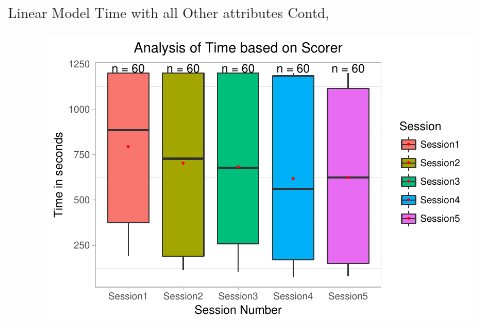 \documentclass{beamer}
\begin{document}
\begin{frame}{Linear Model}{ Time with all Other attributes Contd,}
\begin{figure}
\begin{minipage}[c]{0.4\linewidth}
	\end{minipage}
	\hfill
	\begin{minipage}[c]{0.4\linewidth}
	\includegraphics[width=\linewidth]{SessionVsTime.pdf}
	\end{minipage}
\end{figure}
 \end{frame}
 
\end{document}
